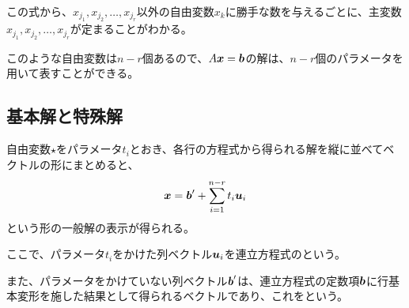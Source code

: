 \documentclass[../../../topic_linear-algebra]{subfiles}
\begin{document}
\br

この式から、$x_{j_1}, x_{j_2}, \dots, x_{j_r}$以外の自由変数$x_k$に勝手な数を与えるごとに、主変数$x_{j_1}, x_{j_2}, \dots, x_{j_r}$が定まることがわかる。

\br

このような自由変数は$n-r$個あるので、$A\vb*{x} = \vb*{b}$の解は、$n-r$個のパラメータを用いて表すことができる。

\subsection{基本解と特殊解}

自由変数$\star$をパラメータ$t_i$とおき、各行の方程式から得られる解を縦に並べてベクトルの形にまとめると、
\begin{equation*}
  \vb*{x} = \vb*{b}' + \sum_{i=1}^{n-r} t_i \vb*{u}_i
\end{equation*}
という形の一般解の表示が得られる。

\br

ここで、パラメータ$t_i$をかけた列ベクトル$\vb*{u}_i$を連立方程式のという。

また、パラメータをかけていない列ベクトル$\vb*{b}'$は、連立方程式の定数項$\vb*{b}$に行基本変形を施した結果として得られるベクトルであり、これをという。
\end{document}
